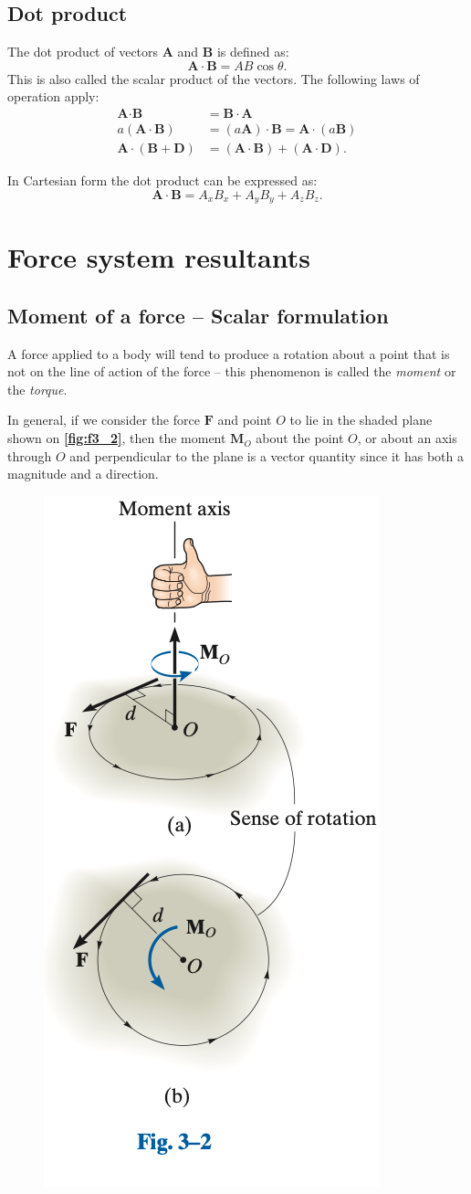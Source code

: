 
\subsection{Dot product}
The dot product of vectors $\textbf{A}$ and $\textbf{B}$ is defined as:
\[ 
\textbf{A}\cdot \textbf{B} = AB \cos \theta
.\]
This is also called the scalar product of the vectors. The following laws of operation apply:
\begin{align*}
  \textbf{A} \cdot \textbf{B} &= \textbf{B} \cdot \textbf{A} \\
  a \left( \textbf{A} \cdot \textbf{B} \right) &= \left( a \textbf{A} \right) \cdot \textbf{B} = \textbf{A} \cdot \left( a \textbf{B} \right) \\
  \textbf{A} \cdot \left( \textbf{B} + \textbf{D} \right) &= \left( \textbf{A} \cdot \textbf{B} \right) + \left( \textbf{A} \cdot \textbf{D} \right)
.\end{align*}

In Cartesian form the dot product can be expressed as:
\[ 
\textbf{A} \cdot \textbf{B} = A_x B_x + A_y B_y + A_z B_z
.\]


\section{Force system resultants}

\subsection{Moment of a force – Scalar formulation}
A force applied to a body will tend to produce a rotation about a point that is not on the line of action of the force -- this phenomenon is called the \textit{moment} or the \textit{torque}. 

In general, if we consider the force $\textbf{F}$ and point $O$ to lie in the shaded plane shown on \textbf{\autoref{fig:f3_2}}, then the moment $\textbf{M}_O$ about the point $O$, or about an axis through $O$ and perpendicular to the plane is a vector quantity since it has both a magnitude and a direction.

\begin{figure} [ht]
  \centering
  \includegraphics[width=0.25\linewidth]{./figures/f3_2.png}
  \caption{}
  \label{fig:f3_2}
\end{figure}

